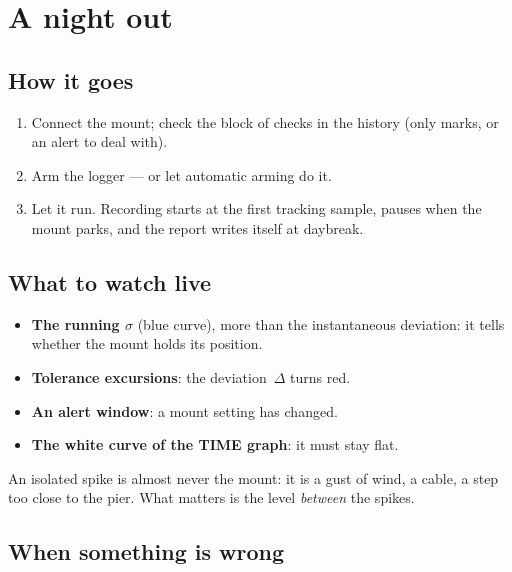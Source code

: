 \chapter{A night out}
\label{ch:night}

\section{How it goes}

\begin{enumerate}
  \item Connect the mount; check the block of checks in the history (only
  \checkmark{} marks, or an alert to deal with).
  \item Arm the logger --- or let automatic arming do it.
  \item Let it run. Recording starts at the first tracking sample, pauses when
  the mount parks, and the report writes itself at daybreak.
\end{enumerate}

\section{What to watch live}

\begin{itemize}
  \item \textbf{The running $\sigma$} (blue curve), more than the instantaneous
  deviation: it tells whether the mount holds its position.
  \item \textbf{Tolerance excursions}: the deviation~$\Delta$ turns red.
  \item \textbf{An alert window}: a mount setting has changed.
  \item \textbf{The white curve of the TIME graph}: it must stay flat.
\end{itemize}

\begin{tip}
An isolated spike is almost never the mount: it is a gust of wind, a cable, a
step too close to the pier. What matters is the level \emph{between} the
spikes.
\end{tip}

\section{When something is wrong}

